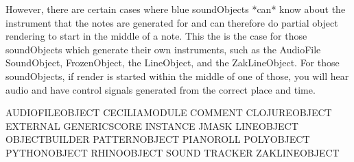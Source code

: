 However, there are certain cases where blue soundObjects *can* know
about the instrument that the notes are generated for and can therefore
do partial object rendering to start in the middle of a note. This the
is the case for those soundObjects which generate their own instruments,
such as the AudioFile SoundObject, FrozenObject, the LineObject, and the
ZakLineObject. For those soundObjects, if render is started within the
middle of one of those, you will hear audio and have control signals
generated from the correct place and time.

AUDIOFILEOBJECT CECILIAMODULE COMMENT CLOJUREOBJECT EXTERNAL
GENERICSCORE INSTANCE JMASK LINEOBJECT OBJECTBUILDER PATTERNOBJECT
PIANOROLL POLYOBJECT PYTHONOBJECT RHINOOBJECT SOUND TRACKER
ZAKLINEOBJECT
